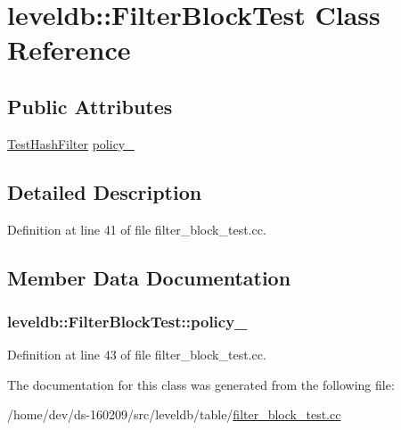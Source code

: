 \hypertarget{classleveldb_1_1_filter_block_test}{}\section{leveldb\+:\+:Filter\+Block\+Test Class Reference}
\label{classleveldb_1_1_filter_block_test}
\subsection*{Public Attributes}
\begin{DoxyCompactItemize}
\item 
\hyperlink{classleveldb_1_1_test_hash_filter}{Test\+Hash\+Filter} \hyperlink{classleveldb_1_1_filter_block_test_ae52fe0fab92f8efc0c078b117cf43e67}{policy\+\_\+}
\end{DoxyCompactItemize}


\subsection{Detailed Description}


Definition at line 41 of file filter\+\_\+block\+\_\+test.\+cc.



\subsection{Member Data Documentation}
\hypertarget{classleveldb_1_1_filter_block_test_ae52fe0fab92f8efc0c078b117cf43e67}{}
\subsubsection[{policy\+\_\+}]{ leveldb\+::\+Filter\+Block\+Test\+::policy\+\_\+}\label{classleveldb_1_1_filter_block_test_ae52fe0fab92f8efc0c078b117cf43e67}


Definition at line 43 of file filter\+\_\+block\+\_\+test.\+cc.



The documentation for this class was generated from the following file\+:\begin{DoxyCompactItemize}
\item 
/home/dev/ds-\/160209/src/leveldb/table/\hyperlink{filter__block__test_8cc}{filter\+\_\+block\+\_\+test.\+cc}\end{DoxyCompactItemize}
